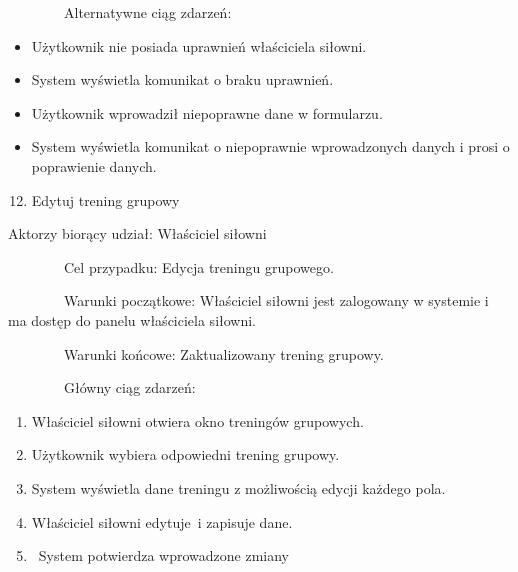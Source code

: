 {~~~~~~~~Alternatywne ciąg zdarzeń:}

\begin{itemize}
\tightlist
\item
  {Użytkownik nie posiada uprawnień właściciela siłowni.}
\end{itemize}

\begin{itemize}
\tightlist
\item
  {System wyświetla komunikat o braku uprawnień.}
\end{itemize}

\begin{itemize}
\tightlist
\item
  {Użytkownik wprowadził niepoprawne dane w formularzu.}
\end{itemize}

\begin{itemize}
\tightlist
\item
  {System wyświetla komunikat o niepoprawnie wprowadzonych danych i
  prosi o poprawienie danych.}
\end{itemize}

{}

\begin{enumerate}
\setcounter{enumi}{11}
\tightlist
\item
  {Edytuj trening grupowy}
\end{enumerate}

{Aktorzy biorący udział: Właściciel siłowni}

{~~~~~~~~Cel przypadku: Edycja treningu grupowego.}

{~~~~~~~~Warunki początkowe: Właściciel siłowni jest zalogowany w
systemie i ma dostęp do panelu właściciela siłowni.}

{~~~~~~~~Warunki końcowe: Zaktualizowany trening grupowy.}

{~~~~~~~~Główny ciąg zdarzeń:}

\begin{enumerate}
\tightlist
\item
  {Właściciel siłowni otwiera okno treningów grupowych.}
\item
  {Użytkownik wybiera odpowiedni trening grupowy.}
\item
  {System wyświetla dane treningu z możliwością edycji każdego pola.}
\item
  {Właściciel siłowni }{edytuje}{~i zapisuje dane.}
\item
  {~System potwierdza wprowadzone zmiany}
\end{enumerate}

